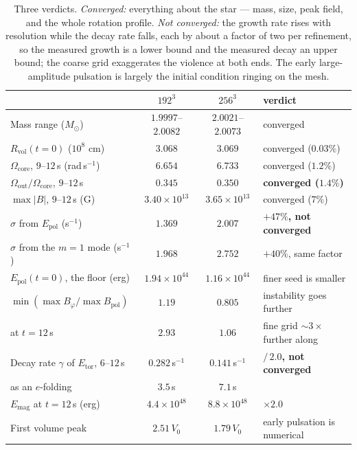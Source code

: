 \documentclass[11pt,a4paper]{article}
\newcommand{\Msun}{M_\odot}
\newcommand{\Rvol}{R_{\mathrm{vol}}}
\newcommand{\Btor}{B_\varphi}
\newcommand{\Bpol}{B_{\mathrm{pol}}}
\newcommand{\Etor}{E_{\mathrm{tor}}}
\newcommand{\Epol}{E_{\mathrm{pol}}}
\newcommand{\Emag}{E_{\mathrm{mag}}}
\begin{document}
\begin{table}[h]
\centering\small
\begin{tabular}{lccl}
\toprule
& $192^3$ & $256^3$ & verdict \\
\midrule
Mass range ($\Msun$) & $1.9997$--$2.0082$ & $2.0021$--$2.0073$ & converged \\
$\Rvol(t=0)$ ($10^8$ cm) & $3.068$ & $3.069$ & converged ($0.03\%$) \\
$\Omega_{\mathrm{core}}$, $9$--$12$\,s (rad\,s$^{-1}$) & $6.654$ & $6.733$ & converged ($1.2\%$) \\
$\Omega_{\mathrm{out}}/\Omega_{\mathrm{core}}$, $9$--$12$\,s & $0.345$ & $0.350$ & \textbf{converged ($1.4\%$)} \\
$\max|B|$, $9$--$12$\,s (G) & $3.40\times10^{13}$ & $3.65\times10^{13}$ & converged ($7\%$) \\
\midrule
$\sigma$ from $\Epol$ (s$^{-1}$) & $1.369$ & $2.007$ & \textbf{$+47\%$, not converged} \\
$\sigma$ from the $m=1$ mode (s$^{-1}$) & $1.968$ & $2.752$ & $+40\%$, same factor \\
$\Epol(t=0)$, the floor (erg) & $1.94\times10^{44}$ & $1.16\times10^{44}$ & finer seed is smaller \\
$\min(\max\Btor/\max\Bpol)$ & $1.19$ & $\mathbf{0.805}$ & instability goes further \\
\quad at $t = 12$\,s & $2.93$ & $\mathbf{1.06}$ & fine grid $\sim3\times$ further along \\
\midrule
Decay rate $\gamma$ of $\Etor$, $6$--$12$\,s & $0.282$\,s$^{-1}$ & $0.141$\,s$^{-1}$ & \textbf{$/\,2.0$, not converged} \\
\quad as an $e$-folding & $3.5$\,s & $7.1$\,s & \\
$\Emag$ at $t = 12$\,s (erg) & $4.4\times10^{48}$ & $8.8\times10^{48}$ & $\times2.0$ \\
First volume peak & $2.51\,V_0$ & $1.79\,V_0$ & early pulsation is numerical \\
\bottomrule
\end{tabular}
\caption{Three verdicts. \emph{Converged:} everything about the star --- mass,
size, peak field, and the whole rotation profile. \emph{Not converged:} the
growth rate rises with resolution while the decay rate falls, each by about a
factor of two per refinement, so the measured growth is a lower bound and the
measured decay an upper bound; the coarse grid exaggerates the violence at both
ends. The early large-amplitude pulsation is largely the initial condition
ringing on the mesh.}
\end{table}
\end{document}
